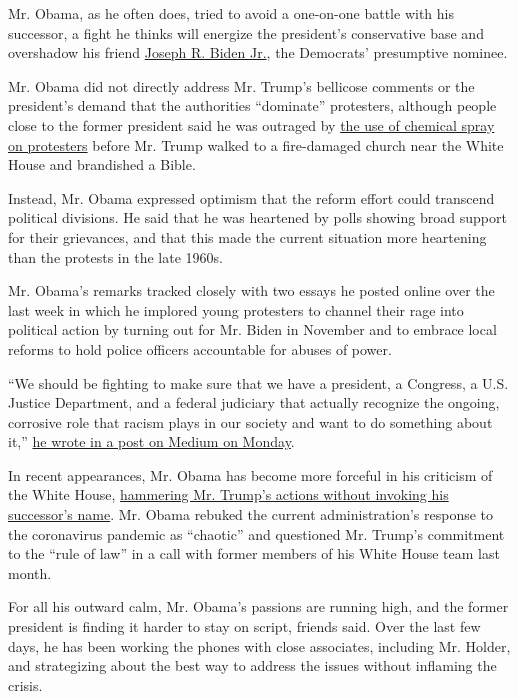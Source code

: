 Mr. Obama, as he often does, tried to avoid a one-on-one battle with his
successor, a fight he thinks will energize the president's conservative
base and overshadow his friend
\href{https://www.nytimes.com/interactive/2020/us/elections/joe-biden.html}{Joseph
R. Biden Jr.}, the Democrats' presumptive nominee.

Mr. Obama did not directly address Mr. Trump's bellicose comments or the
president's demand that the authorities ``dominate'' protesters,
although people close to the former president said he was outraged by
\href{https://www.nytimes.com/2020/06/02/us/politics/trump-walk-lafayette-square.html}{the
use of chemical spray on protesters} before Mr. Trump walked to a
fire-damaged church near the White House and brandished a Bible.

Instead, Mr. Obama expressed optimism that the reform effort could
transcend political divisions. He said that he was heartened by polls
showing broad support for their grievances, and that this made the
current situation more heartening than the protests in the late 1960s.

Mr. Obama's remarks tracked closely with two essays he posted online
over the last week in which he implored young protesters to channel
their rage into political action by turning out for Mr. Biden in
November and to embrace local reforms to hold police officers
accountable for abuses of power.

``We should be fighting to make sure that we have a president, a
Congress, a U.S. Justice Department, and a federal judiciary that
actually recognize the ongoing, corrosive role that racism plays in our
society and want to do something about it,''
\href{https://medium.com/@BarackObama/how-to-make-this-moment-the-turning-point-for-real-change-9fa209806067}{he
wrote in a post on Medium on Monday}.

In recent appearances, Mr. Obama has become more forceful in his
criticism of the White House,
\href{https://www.nytimes.com/2020/05/09/us/politics/obama-flynn-coronavirus-trump.html}{hammering
Mr. Trump's actions without invoking his successor's name}. Mr. Obama
rebuked the current administration's response to the coronavirus
pandemic as ``chaotic'' and questioned Mr. Trump's commitment to the
``rule of law'' in a call with former members of his White House team
last month.

For all his outward calm, Mr. Obama's passions are running high, and the
former president is finding it harder to stay on script, friends said.
Over the last few days, he has been working the phones with close
associates, including Mr. Holder, and strategizing about the best way to
address the issues without inflaming the crisis.

